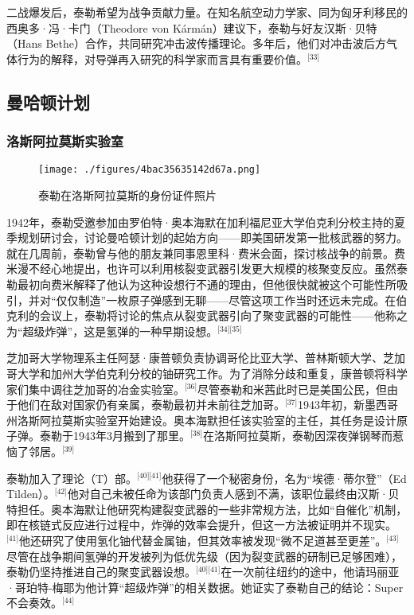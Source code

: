 二战爆发后，泰勒希望为战争贡献力量。在知名航空动力学家、同为匈牙利移民的西奥多·冯·卡门（Theodore von Kármán）建议下，泰勒与好友汉斯·贝特（Hans Bethe）合作，共同研究冲击波传播理论。多年后，他们对冲击波后方气体行为的解释，对导弹再入研究的科学家而言具有重要价值。\(^\text{[33]}\)
\subsection{曼哈顿计划}
\subsubsection{洛斯阿拉莫斯实验室}
\begin{figure}[ht]
\centering
\texttt{[image: ./figures/4bac35635142d67a.png]}
\caption{泰勒在洛斯阿拉莫斯的身份证件照片} \label{fig_ADHTL_4}
\end{figure}
1942年，泰勒受邀参加由罗伯特·奥本海默在加利福尼亚大学伯克利分校主持的夏季规划研讨会，讨论曼哈顿计划的起始方向——即美国研发第一批核武器的努力。就在几周前，泰勒曾与他的朋友兼同事恩里科·费米会面，探讨核战争的前景。费米漫不经心地提出，也许可以利用核裂变武器引发更大规模的核聚变反应。虽然泰勒最初向费米解释了他认为这种设想行不通的理由，但他很快就被这个可能性所吸引，并对“仅仅制造”一枚原子弹感到无聊——尽管这项工作当时还远未完成。在伯克利的会议上，泰勒将讨论的焦点从裂变武器引向了聚变武器的可能性——他称之为“超级炸弹”，这是氢弹的一种早期设想。\(^\text{[34][35]}\)

芝加哥大学物理系主任阿瑟·康普顿负责协调哥伦比亚大学、普林斯顿大学、芝加哥大学和加州大学伯克利分校的铀研究工作。为了消除分歧和重复，康普顿将科学家们集中调往芝加哥的冶金实验室。\(^\text{[36]}\)尽管泰勒和米茜此时已是美国公民，但由于他们在敌对国家仍有亲属，泰勒最初并未前往芝加哥。\(^\text{[37]}\)1943年初，新墨西哥州洛斯阿拉莫斯实验室开始建设。奥本海默担任该实验室的主任，其任务是设计原子弹。泰勒于1943年3月搬到了那里。\(^\text{[38]}\)在洛斯阿拉莫斯，泰勒因深夜弹钢琴而惹恼了邻居。\(^\text{[39]}\)

泰勒加入了理论（T）部。\(^\text{[40][41]}\)他获得了一个秘密身份，名为“埃德·蒂尔登”（Ed Tilden）。\(^\text{[42]}\)他对自己未被任命为该部门负责人感到不满，该职位最终由汉斯·贝特担任。奥本海默让他研究构建裂变武器的一些非常规方法，比如“自催化”机制，即在核链式反应进行过程中，炸弹的效率会提升，但这一方法被证明并不现实。\(^\text{[41]}\)他还研究了使用氢化铀代替金属铀，但其效率被发现“微不足道甚至更差”。\(^\text{[43]}\)尽管在战争期间氢弹的开发被列为低优先级（因为裂变武器的研制已足够困难），泰勒仍坚持推进自己的聚变武器设想。\(^\text{[40][41]}\)在一次前往纽约的途中，他请玛丽亚·哥珀特-梅耶为他计算“超级炸弹”的相关数据。她证实了泰勒自己的结论：Super 不会奏效。\(^\text{[44]}\)

